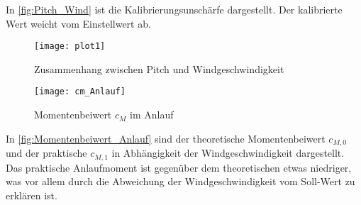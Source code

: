 In \autoref{fig:Pitch_Wind} ist die Kalibrierungsunschärfe dargestellt. Der kalibrierte Wert weicht vom Einstellwert ab.
\begin{figure}[H]
    \centering
    \texttt{[image: plot1]}
    \caption{Zusammenhang zwischen Pitch und Windgeschwindigkeit}
    \label{fig:Pitch_Wind}
\end{figure}
\newpage
\begin{figure}[H]
    \centering
    \texttt{[image: cm\_Anlauf]}
    \caption{Momentenbeiwert $c_M$ im Anlauf}
    \label{fig:Momentenbeiwert_Anlauf}
\end{figure}
In \autoref{fig:Momentenbeiwert_Anlauf} sind der theoretische Momentenbeiwert $c_{M,0}$ und der praktische $c_{M,1}$ in Abhängigkeit der Windgeschwindigkeit dargestellt.
Das praktische Anlaufmoment ist gegenüber dem theoretischen etwas niedriger, was vor allem durch die Abweichung der Windgeschwindigkeit vom Soll-Wert zu erklären ist.

